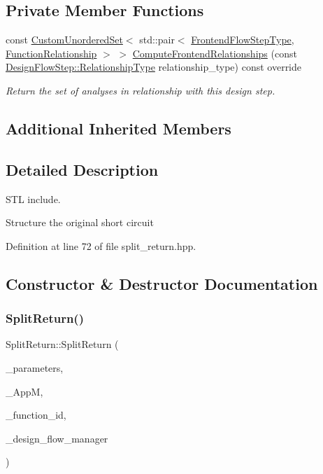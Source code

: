 \subsection*{Private Member Functions}
\begin{DoxyCompactItemize}
\item 
const \hyperlink{classCustomUnorderedSet}{Custom\+Unordered\+Set}$<$ std\+::pair$<$ \hyperlink{frontend__flow__step_8hpp_afeb3716c693d2b2e4ed3e6d04c3b63bb}{Frontend\+Flow\+Step\+Type}, \hyperlink{classFrontendFlowStep_af7cf30f2023e5b99e637dc2058289ab0}{Function\+Relationship} $>$ $>$ \hyperlink{classSplitReturn_a2f9de3a552fe9dc6841b4f1565181b71}{Compute\+Frontend\+Relationships} (const \hyperlink{classDesignFlowStep_a723a3baf19ff2ceb77bc13e099d0b1b7}{Design\+Flow\+Step\+::\+Relationship\+Type} relationship\+\_\+type) const override
\begin{DoxyCompactList}\small\item\em Return the set of analyses in relationship with this design step. \end{DoxyCompactList}\end{DoxyCompactItemize}
\subsection*{Additional Inherited Members}


\subsection{Detailed Description}
S\+TL include. 

Structure the original short circuit 

Definition at line 72 of file split\+\_\+return.\+hpp.



\subsection{Constructor \& Destructor Documentation}
\mbox{\label{classSplitReturn_a74a7cd61e81ae6f4da3660ad5bfd8796}} 
\subsubsection{\texorpdfstring{Split\+Return()}{SplitReturn()}}
{\footnotesize\ttfamily Split\+Return\+::\+Split\+Return (\begin{DoxyParamCaption}\item[{const \hyperlink{Parameter_8hpp_a37841774a6fcb479b597fdf8955eb4ea}{Parameter\+Const\+Ref}}]{\+\_\+parameters,  }\item[{const \hyperlink{application__manager_8hpp_a04ccad4e5ee401e8934306672082c180}{application\+\_\+manager\+Ref}}]{\+\_\+\+AppM,  }\item[{unsigned int}]{\+\_\+function\+\_\+id,  }\item[{const Design\+Flow\+Manager\+Const\+Ref}]{\+\_\+design\+\_\+flow\+\_\+manager }\end{DoxyParamCaption})}



